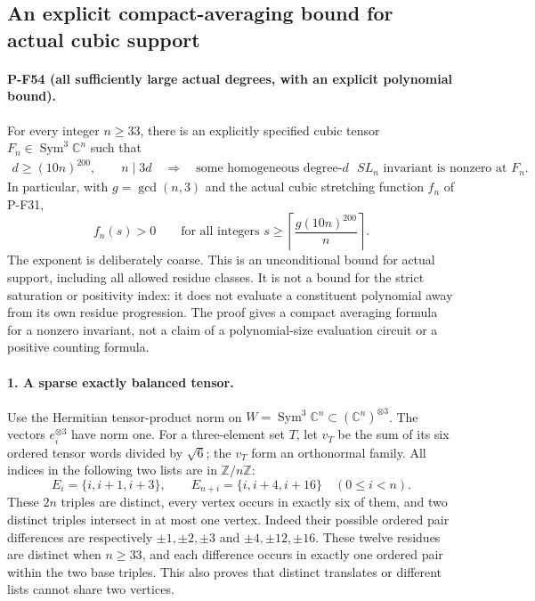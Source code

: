 \documentclass[11pt,a4paper]{article}
\begin{document}
\subsection{An explicit compact-averaging bound for actual cubic support}
\label{sec:cubic-reynolds-support}

\paragraph{P-F54 (all sufficiently large actual degrees, with an explicit polynomial bound).}
For every integer $n\ge33$, there is an explicitly specified
cubic tensor $F_n\in\operatorname{Sym}^3\mathbb C^n$ such that
\[
 \begin{gathered}
 d\ge(10n)^{200},\qquad n\mid3d
 \quad\Longrightarrow\quad
 \text{some homogeneous degree-$d$ $SL_n$ invariant is nonzero at }F_n.
 \end{gathered}                                                   \tag{P-F54a}
\]
In particular, with $g=\gcd(n,3)$ and the actual cubic stretching
function $f_n$ of P-F31,
\[
 f_n(s)>0\qquad\text{for all integers }s\ge
             \left\lceil\frac{g(10n)^{200}}n\right\rceil .        \tag{P-F54b}
\]
The exponent is deliberately coarse. This is an unconditional
bound for actual support, including all allowed residue classes.
It is not a bound for the strict saturation or positivity index:
it does not evaluate a constituent polynomial away from its own
residue progression. The proof gives a compact averaging formula
for a nonzero invariant, not a claim of a polynomial-size
evaluation circuit or a positive counting formula.

\paragraph{1. A sparse exactly balanced tensor.}
Use the Hermitian tensor-product norm on
$W=\operatorname{Sym}^3\mathbb C^n\subset(\mathbb C^n)^{\otimes3}$.
The vectors $e_i^{\otimes3}$ have norm one. For a three-element
set $T$, let $v_T$ be the sum of its six ordered tensor words
divided by $\sqrt6$; the $v_T$ form an orthonormal family.
All indices in the following two lists are in $\mathbb Z/n\mathbb Z$:
\[
 E_i=\{i,i+1,i+3\},\qquad E_{n+i}=\{i,i+4,i+16\}
                      \quad(0\le i<n).                         \tag{P-F54c}
\]
These $2n$ triples are distinct, every vertex occurs in exactly six
of them, and two distinct triples intersect in at most one vertex.
Indeed their possible ordered pair differences are respectively
$\pm1,\pm2,\pm3$ and $\pm4,\pm12,\pm16$. These twelve
residues are distinct when $n\ge33$, and each difference occurs
in exactly one ordered pair within the two base triples. This
also proves that distinct translates or different lists cannot
share two vertices.
\end{document}
